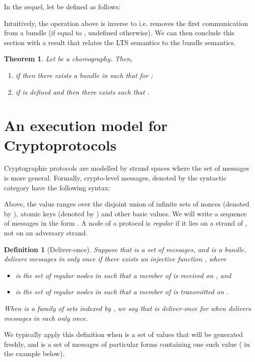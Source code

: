 \documentclass[copyright]{eptcs}
\newtheorem{theorem}{Theorem}
\newcommand{\NI}{\noindent}
\newtheorem{definition}{Definition}
\begin{document}
\smallskip

\smallskip

\NI In the sequel, let  be defined
as follows: 

Intuitively, the operation above is inverse to  i.e. removes the first communication from a bundle (if
equal to , undefined otherwise). We can then conclude this
section with a result that relates the LTS semantics to the bundle
semantics. 
\begin{theorem}\label{theorem}
  Let  be a choreography. Then, 
  \begin{enumerate}

  \item if  then there exists a bundle  in
     such that
     for ;

  \item if  is defined and  then there exists  such that .

  \end{enumerate}
\end{theorem} 



\section{An execution model for Cryptoprotocols}
\label{sec:cryptoprotocols}


Cryptographic protocols are modelled by strand spaces where the set of
messages  is more general. Formally, crypto-level messages, denoted
by the syntactic category  have the following syntax:

Above, the value  ranges over the disjoint union of infinite sets
of nonces (denoted by ), atomic keys (denoted by ) and other
basic values.  We will write a sequence of messages in the form
. A node of a protocol  is
\emph{regular} if it lies on a strand of , not on an adversary
strand.

\begin{definition}[Deliver-once] Suppose that  is a set of
  messages, and  is a bundle.   \emph{delivers messages
    in}  \emph{only once} if  there exists an injective
  function , where
\begin{itemize}
  \item  is the set of regular nodes  in  such that a
    member of  is received on , and
  \item  is the set of regular nodes  in  such that a
    member of  is transmitted on .
  \end{itemize} 
When  is a family of sets indexed by , we
  say that  is \emph{deliver-once} for  when
   delivers messages in each  only once.
\end{definition} 
We typically apply this definition when  is a set of values that
will be generated freshly, and  is a set of messages of
particular forms containing one such value  ( in the
example below).
\end{document}
